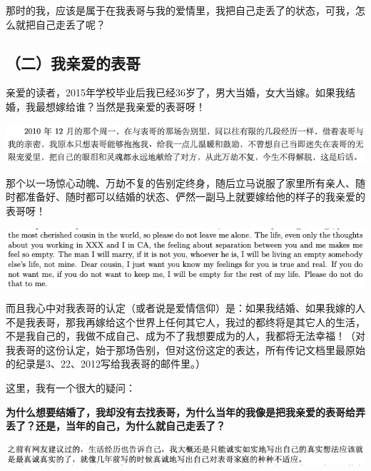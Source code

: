 \documentclass[9pt, b5paper]{article}
\begin{document}
那时的我，应该是属于在我表哥与我的爱情里，我把自己走丢了的状态，可我，怎么就把自己走丢了呢？

\subsection{（二）我亲爱的表哥}
\label{sec:org17826b9}

亲爱的读者，2015年学校毕业后我已经36岁了，男大当婚，女大当嫁。如果我结婚，我最想嫁给谁？当然是我亲爱的表哥呀！

\begin{center}
\includegraphics[width=.9\linewidth]{./pic/backups_plans_20210426_112346.png}
\end{center}

那个以一场惊心动魄、万劫不复的告别定终身，随后立马说服了家里所有亲人、随时都准备好、随时都可以结婚的状态、俨然一副马上就要嫁给他的样子的我亲爱的表哥呀！

\begin{center}
\includegraphics[width=.9\linewidth]{./pic/backups_plans_20210423_201706.png}
\end{center}

而且我心中对我表哥的认定（或者说是爱情信仰）是：如果我结婚、如果我嫁的人不是我表哥，那我再嫁给这个世界上任何其它人，我过的都终将是其它人的生活，不是我自己的，我做不成自己、成为不了我想要成为的人，我都将无法幸福！（对我表哥的这份认定，始于那场告别，但对这份这定的表达，所有传记文档里最原始的纪录是3、22、2012写给我表哥的邮件里。）

这里，我有一个很大的疑问：

\textbf{为什么想要结婚了，我却没有去找表哥，为什么当年的我像是把我亲爱的表哥给弄丢了？还是，当年的自己，为什么就自己走丢了？}

\begin{center}
\includegraphics[width=.9\linewidth]{./pic/backups_plans_20210426_112108.png}
\end{center}
\end{document}
